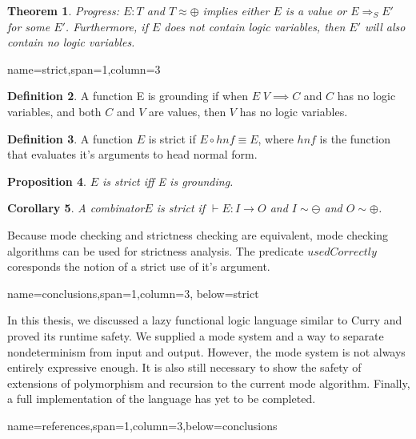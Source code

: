 \documentclass[a0paper,landscape]{baposter}
\theoremstyle{definition}
\theoremstyle{plain}
\newtheorem{thm}{Theorem}
\theoremstyle{definition}
\newtheorem{defn}[thm]{Definition}
\theoremstyle{plain}
\theoremstyle{plain}
\newtheorem{prop}[thm]{Proposition}
\theoremstyle{plain}
\newtheorem{cor}[thm]{Corollary}
\begin{document}
\begin{poster}
{\begin{thm}
Progress: $E:T$ and $T\approx\oplus$ implies either $E$ is a value
or $E\Rightarrow_{S}E'$ for some $E'$. Furthermore, if $E$ does
not contain logic variables, then $E'$ will also contain no logic
variables.
\end{thm}
}

{name=strict,span=1,column=3}{
\smaller %
\begin{defn}
A function E is grounding if when $E\; V\implies C$ and $C$ has
no logic variables, and both $C$ and $V$ are values, then $V$ has
no logic variables.
\end{defn}

\begin{defn}
A function $E$ is strict if $E\circ hnf\equiv E$, where $hnf$ is
the function that evaluates it's arguments to head normal form. \end{defn}
\begin{prop}
$E$ is strict iff E is grounding.\end{prop}
\begin{cor}
A combinator$E$ is strict if $\vdash E:I\rightarrow O$ and $I\sim\ominus$
and $O\sim\oplus$. 
\end{cor}
Because mode checking and strictness checking are equivalent, mode
checking algorithms can be used for strictness analysis. The predicate
$usedCorrectly$ coresponds the notion of a strict use of it's argument.
}


{name=conclusions,span=1,column=3, below=strict}{
In this thesis, we discussed a lazy functional logic language similar
to Curry\citep{Curry} and proved its runtime safety. We supplied
a mode system and a way to separate nondeterminism from input and
output. However, the mode system is not always entirely expressive
enough. It is also still necessary to show the safety of extensions
of polymorphism and recursion to the current mode algorithm. Finally,
a full implementation of the language has yet to be completed.

}


\headerbox{}
{name=references,span=1,column=3,below=conclusions}{
\smaller %
\vspace{-0.4em} %




}

\end{poster}
\end{document}
